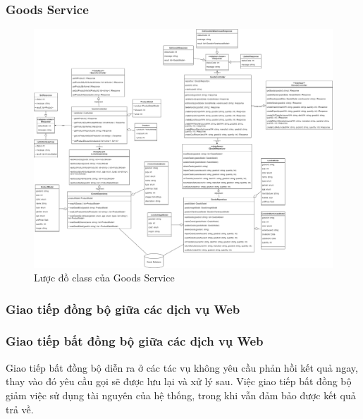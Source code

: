 \subsubsection{Goods Service}
\begin{figure}[!htp]
	\centering
	\includegraphics[width=17cm]{img/Architecture/service/GoodsService.png}
	\newline
	\caption{Lược đồ class của Goods Service}
\end{figure}



\subsubsection{Giao tiếp đồng bộ giữa các dịch vụ Web}



\subsubsection{Giao tiếp bất đồng bộ giữa các dịch vụ Web}

\par Giao tiếp bất đồng bộ diễn ra ở các tác vụ không yêu cầu phản hồi kết quả ngay, thay vào đó yêu cầu gọi sẽ được lưu lại và xử lý sau. Việc giao tiếp bất đồng bộ giảm việc sử dụng tài nguyên của hệ thống, trong khi vẫn đảm bảo được kết quả trả về.

